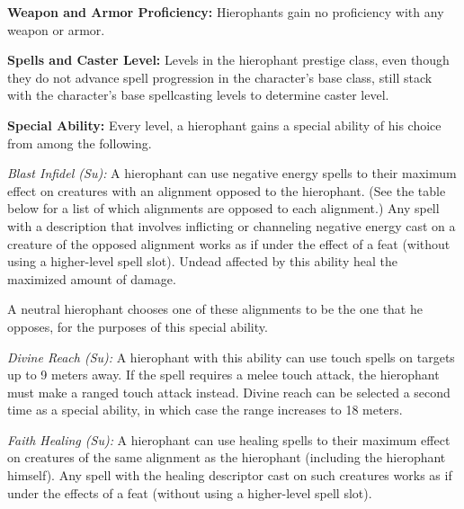 {
\textbf{Weapon and Armor Proficiency:} Hierophants gain no proficiency with any weapon or armor.

\textbf{Spells and Caster Level:} Levels in the hierophant prestige class, even though they do not advance spell progression in the character's base class, still stack with the character's base spellcasting levels to determine caster level.

\textbf{Special Ability:} Every level, a hierophant gains a special ability of his choice from among the following.

\textit{Blast Infidel (Su):} A hierophant can use negative energy spells to their maximum effect on creatures with an alignment opposed to the hierophant. (See the table below for a list of which alignments are opposed to each alignment.) Any spell with a description that involves inflicting or channeling negative energy cast on a creature of the opposed alignment works as if under the effect of a  feat (without using a higher-level spell slot). Undead affected by this ability heal the maximized amount of damage.

A neutral hierophant chooses one of these alignments to be the one that he opposes, for the purposes of this special ability.


\textit{Divine Reach (Su):} A hierophant with this ability can use touch spells on targets up to 9 meters away. If the spell requires a melee touch attack, the hierophant must make a ranged touch attack instead. Divine reach can be selected a second time as a special ability, in which case the range increases to 18 meters.

\textit{Faith Healing (Su):} A hierophant can use healing spells to their maximum effect on creatures of the same alignment as the hierophant (including the hierophant himself). Any spell with the healing descriptor cast on such creatures works as if under the effects of a  feat (without using a higher-level spell slot).

}
